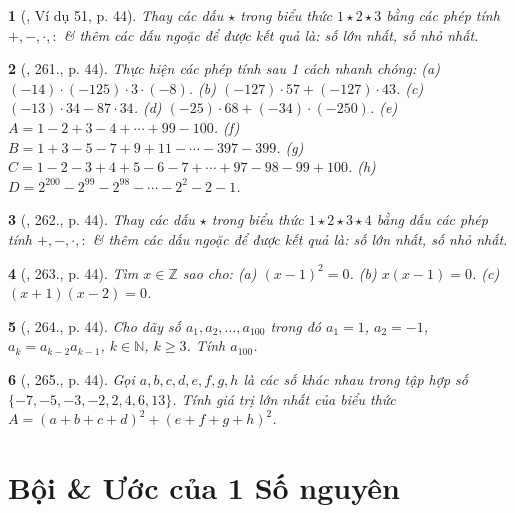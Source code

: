 \documentclass{article}
\newtheorem{baitoan}{}
\begin{document}
\begin{baitoan}[\cite{Binh_Toan_6_tap_1}, Ví dụ 51, p. 44]
	Thay các dấu $\star$ trong biểu thức $1\star2\star3$ bằng các phép tính $+,-,\cdot,:$ \& thêm các dấu ngoặc để được kết quả là: số lớn nhất, số nhỏ nhất.
\end{baitoan}

\begin{baitoan}[\cite{Binh_Toan_6_tap_1}, 261., p. 44]
	Thực hiện các phép tính sau 1 cách nhanh chóng: (a) $(-14)\cdot(-125)\cdot3\cdot(-8)$. (b) $(-127)\cdot57 + (-127)\cdot43$. (c) $(-13)\cdot34 - 87\cdot34$. (d) $(-25)\cdot68 + (-34)\cdot(-250)$. (e) $A = 1 - 2 + 3 - 4 + \cdots + 99 - 100$. (f) $B = 1 + 3 - 5 - 7 + 9 + 11 - \cdots - 397 - 399$. (g) $C = 1 - 2 - 3 + 4 + 5 - 6 - 7 + \cdots + 97 - 98 - 99 + 100$. (h) $D = 2^{200} - 2^{99} - 2^{98} - \cdots - 2^2 - 2 - 1$.
\end{baitoan}

\begin{baitoan}[\cite{Binh_Toan_6_tap_1}, 262., p. 44]
	Thay các dấu  $\star$ trong biểu thức $1\star2\star3\star4$ bằng dấu các phép tính $+,-,\cdot,:$ \& thêm các dấu ngoặc để được kết quả là: số lớn nhất, số nhỏ nhất.
\end{baitoan}

\begin{baitoan}[\cite{Binh_Toan_6_tap_1}, 263., p. 44]
	Tìm $x\in\mathbb{Z}$ sao cho: (a) $(x - 1)^2 = 0$. (b) $x(x - 1) = 0$. (c) $(x + 1)(x - 2) = 0$.
\end{baitoan}

\begin{baitoan}[\cite{Binh_Toan_6_tap_1}, 264., p. 44]
	Cho dãy số $a_1,a_2,\ldots,a_{100}$ trong đó $a_1 = 1$, $a_2 = -1$, $a_k = a_{k-2}a_{k-1}$, $k\in\mathbb{N}$, $k\ge 3$. Tính $a_{100}$.
\end{baitoan}

\begin{baitoan}[\cite{Binh_Toan_6_tap_1}, 265., p. 44]
	Gọi $a,b,c,d,e,f,g,h$ là các số khác nhau trong tập hợp số $\{-7,-5,-3,-2,2,4,6,13\}$. Tính giá trị lớn nhất của biểu thức $A = (a + b + c + d)^2 + (e + f + g + h)^2$.
\end{baitoan}


\section{Bội \& Ước của 1 Số nguyên}
\end{document}
